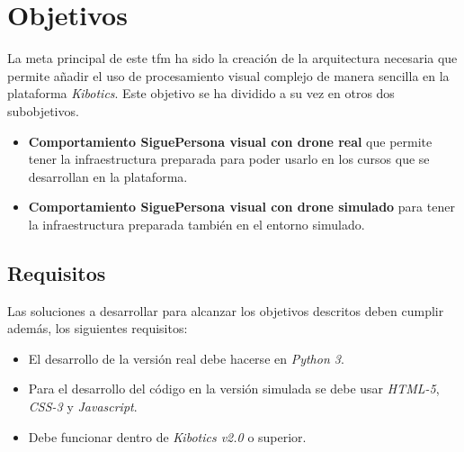\section{Objetivos}\label{sec.objetivos}

La meta principal de este \acrshort{tfm} ha sido la creación de la arquitectura necesaria que permite añadir el uso de procesamiento visual complejo de manera sencilla en la plataforma \textit{Kibotics}. Este objetivo se ha dividido a su vez en otros dos subobjetivos.

\begin{itemize}
  \item \textbf{Comportamiento SiguePersona visual con drone real} que permite tener la infraestructura preparada para poder usarlo en los cursos que se desarrollan en la plataforma.
  \item \textbf{Comportamiento SiguePersona visual con drone simulado} para tener la infraestructura preparada también en el entorno simulado.
\end{itemize}

\subsection*{Requisitos}
Las soluciones a desarrollar para alcanzar los objetivos descritos deben cumplir además, los siguientes requisitos:

\begin{itemize}
  \item El desarrollo de la versión real debe hacerse en \textit{Python 3}.
  \item Para el desarrollo del código en la versión simulada se debe usar \textit{HTML-5}, \textit{CSS-3} y \textit{Javascript}.
  \item Debe funcionar dentro de \textit{Kibotics v2.0} o superior.
\end{itemize}